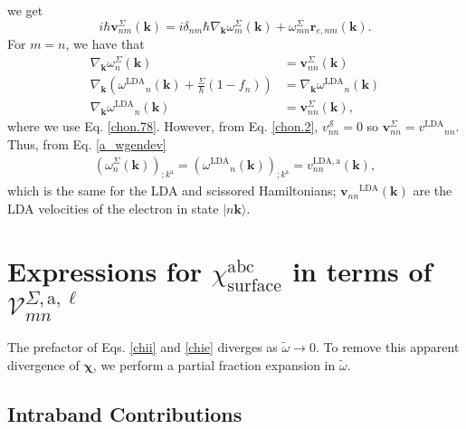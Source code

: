 we get
\begin{equation}\label{a_hrt2}
i\hbar\mathbf{v}^{\Sigma}_{nm}(\mathbf{k})
= i\delta_{nm}\hbar\nabla_{\mathbf{k}}\omega^{\Sigma}_{m}(\mathbf{k})
  + \omega^{\Sigma}_{mn}\mathbf{r}_{e,nm}(\mathbf{k}).
\end{equation}
For $m = n$, we have that
\begin{align}\label{a_gradw}
\nabla_{\mathbf{k}}\omega^{\Sigma}_{n}(\mathbf{k})
    &= \mathbf{v}^{\Sigma}_{nn}(\mathbf{k})\nonumber\\
\nabla_{\mathbf{k}}(\omega{^\mathrm{LDA}}_{n}(\mathbf{k})
    + \frac{\Sigma}{\hbar}(1-f_{n}))
&= \nabla_{\mathbf{k}}\omega{^\mathrm{LDA}}_{n}(\mathbf{k})\nonumber\\
\nabla_{\mathbf{k}}\omega{^\mathrm{LDA}}_{n}(\mathbf{k})
    &= \mathbf{v}^{\Sigma}_{nn}(\mathbf{k}),
\end{align}
where we use Eq. \eqref{chon.78}. However, from Eq. \eqref{chon.2},
$v^{\mathcal{S}}_{nn} = 0$ so $\mathbf{v}^{\Sigma}_{nn}=v{^\mathrm{LDA}}_{nn}$.
Thus, from Eq. \eqref{a_wgendev}
\begin{align}\label{a_gradw2}
(\omega^{\Sigma}_{n}(\mathbf{k}))_{;k^{\mathrm{a}}}
= (\omega{^\mathrm{LDA}}_{n}(\mathbf{k}))_{;k^{\mathrm{a}}}
= v^{\mathrm{LDA},\mathrm{a}}_{nn}(\mathbf{k}),
\end{align}
which is the same for the LDA and scissored Hamiltonians;
$\mathbf{v}_{nn}{^\mathrm{LDA}}(\mathbf{k})$ are the LDA velocities of the
electron in state $\vert n\mathbf{k}\rangle$.



\section{Expressions for 
\texorpdfstring{$\chi_{\mathrm{surface}}^{\mathrm{abc}}$}{Xabc} in terms of
\texorpdfstring{$\mathcal{V}^{\Sigma,\text{a},\ell}_{mn}$}{Vmn}}
\label{appv}

The prefactor of Eqs. \eqref{chii} and \eqref{chie} diverges as $\tilde\omega\to
0$. To remove this apparent divergence of $\boldsymbol{\chi}$, we perform a
partial fraction expansion in $\tilde\omega$.



\subsection{Intraband Contributions}

